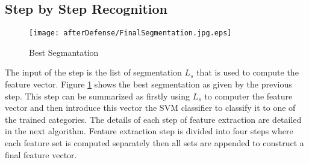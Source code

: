 \subsection{Step by Step Recognition}
\label{sec:steprec}

\begin{figure}
	\centering
		\texttt{[image: afterDefense/FinalSegmentation.jpg.eps]}
	\caption{Best Segmantation }
	\label{fig:segmentatiofinal.jpg}
\end{figure}


	The input of the step is the list of segmentation $L_s$ that is used to compute the feature vector. Figure \ref{fig:segmentatiofinal.jpg} shows the best segmentation as given by the previous step. This step can be summarized as firstly using $L_s$ to computer the feature vector and then introduce this vector the SVM classifier to classify it to one of the trained categories. The details of each step of feature extraction are detailed in the next algorithm. Feature extraction step is divided into four steps where each feature set is computed separately then all sets are appended to construct a final feature vector. 
	
